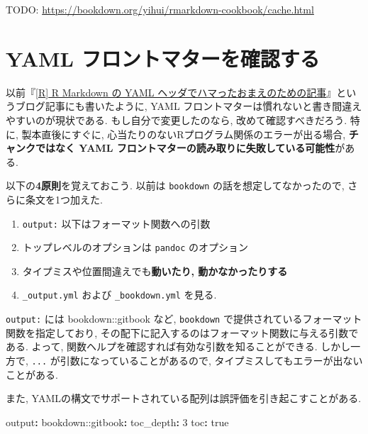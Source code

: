 \documentclass[
]{bxjsbook}
\newenvironment{Shaded}{\begin{snugshade}}{\end{snugshade}}
\newcommand{\AttributeTok}[1]{\textcolor[rgb]{0.77,0.63,0.00}{#1}}
\newcommand{\CharTok}[1]{\textcolor[rgb]{0.31,0.60,0.02}{#1}}
\newcommand{\DecValTok}[1]{\textcolor[rgb]{0.00,0.00,0.81}{#1}}
\newcommand{\FunctionTok}[1]{\textcolor[rgb]{0.00,0.00,0.00}{#1}}
\newcommand{\KeywordTok}[1]{\textcolor[rgb]{0.13,0.29,0.53}{\textbf{#1}}}
\providecommand{\tightlist}{%
  \setlength{\itemsep}{0pt}\setlength{\parskip}{0pt}}
\theoremstyle{definition}
\theoremstyle{definition}
\theoremstyle{definition}
\theoremstyle{remark}
\begin{document}
TODO: \url{https://bookdown.org/yihui/rmarkdown-cookbook/cache.html}

\hypertarget{yaml-ux30d5ux30edux30f3ux30c8ux30deux30bfux30fcux3092ux78baux8a8dux3059ux308b}{%
\section{YAML
フロントマターを確認する}\label{yaml-ux30d5ux30edux30f3ux30c8ux30deux30bfux30fcux3092ux78baux8a8dux3059ux308b}}

以前『\href{https://ill-identified.hatenablog.com/entry/2020/09/05/202403}{{[}R{]}
R Markdown の YAML
ヘッダでハマったおまえのための記事}』というブログ記事にも書いたように,
YAML フロントマターは慣れないと書き間違えやすいのが現状である.
もし自分で変更したのなら, 改めて確認すべきだろう. 特に,
製本直後にすぐに, 心当たりのないRプログラム関係のエラーが出る場合,
\textbf{チャンクではなく YAML
フロントマターの読み取りに失敗している可能性}がある.

以下の\textbf{4原則}を覚えておこう. 以前は \texttt{bookdown}
の話を想定してなかったので, さらに条文を1つ加えた.

\begin{enumerate}
\def\labelenumi{\arabic{enumi}.}
\tightlist
\item
  \texttt{output:} 以下はフォーマット関数への引数
\item
  トップレベルのオプションは \texttt{pandoc} のオプション
\item
  タイプミスや位置間違えでも\textbf{動いたり, 動かなかったりする}
\item
  \texttt{\_output.yml} および \texttt{\_bookdown.yml} を見る.
\end{enumerate}

\texttt{output:} には bookdown::gitbook など, \texttt{bookdown}
で提供されているフォーマット関数を指定しており,
その配下に記入するのはフォーマット関数に与える引数である. よって,
関数ヘルプを確認すれば有効な引数を知ることができる. しかし一方で,
\texttt{...} が引数になっていることがあるので,
タイプミスしてもエラーが出ないことがある.

また, YAMLの構文でサポートされている配列は誤評価を引き起こすことがある.

\begin{Shaded}
\begin{Highlighting}[]
\FunctionTok{output}\KeywordTok{:}
\AttributeTok{  bookdown:}\FunctionTok{:gitbook}\KeywordTok{:}
\AttributeTok{    }\FunctionTok{toc\_depth}\KeywordTok{:}\AttributeTok{ }\DecValTok{3}
\AttributeTok{    }\FunctionTok{toc}\KeywordTok{:}\AttributeTok{ }\CharTok{true}
\end{Highlighting}
\end{Shaded}
\end{document}

